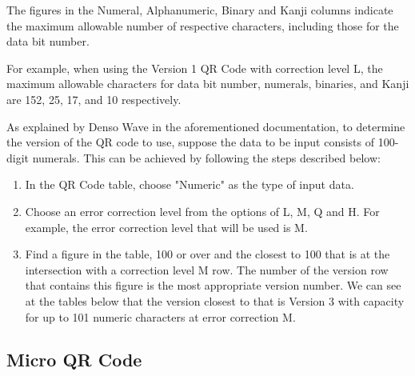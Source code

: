 \documentclass[../../1_thesis]{subfiles}
\begin{document}
The figures in the Numeral, Alphanumeric, Binary and Kanji columns indicate the maximum allowable number of respective characters, including those for the data bit number.

For example, when using the Version 1 QR Code with correction level L, the maximum allowable characters for data bit number, numerals, binaries, and Kanji are 152, 25, 17, and 10 respectively.

As explained by Denso Wave in the aforementioned documentation, to determine the version of the QR code to use, suppose the data to be input consists of 100-digit numerals. This can be achieved by following the steps described below\cite{denso-wave-qr-versions}:

\begin{enumerate}
  \item In the QR Code table, choose "Numeric" as the type of input data.
  \item Choose an error correction level from the options of L, M, Q and H. For example, the error correction level that will be used is M.
  \item Find a figure in the table, 100 or over and the closest to 100 that is at the intersection with a correction level M row. The number of the version row that contains this figure is the most appropriate version number. We can see at the tables below that the version closest to that is Version 3 with capacity for up to 101 numeric characters at error correction M. 
\end{enumerate}

\subsection{Micro QR Code}
\end{document}
